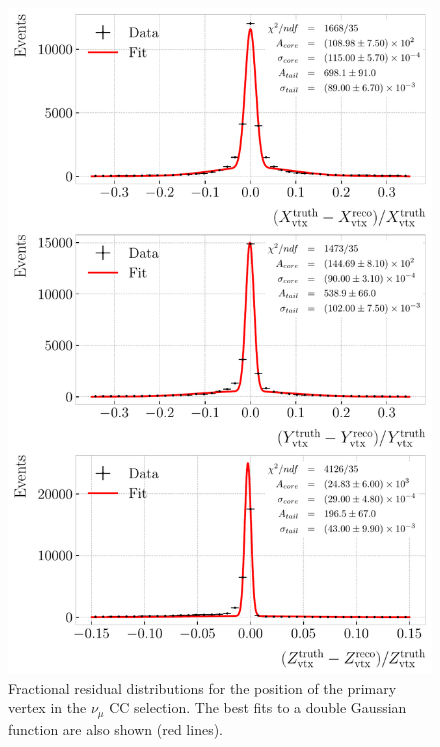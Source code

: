 \begin{figure}[p!]
    \centering
    \includegraphics[width=.80\linewidth]{Images/GAr_selection/numuCC_muon_vtx_residuals.pdf}
    \caption[Fractional residual distributions for the position of the primary vertex in the $\nu_{\mu}$ CC selection.]{Fractional residual distributions for the position of the primary vertex in the $\nu_{\mu}$ CC selection. The best fits to a double Gaussian function are also shown (red lines).}
    \label{fig:numuCC_vertex_residuals}
\end{figure}

